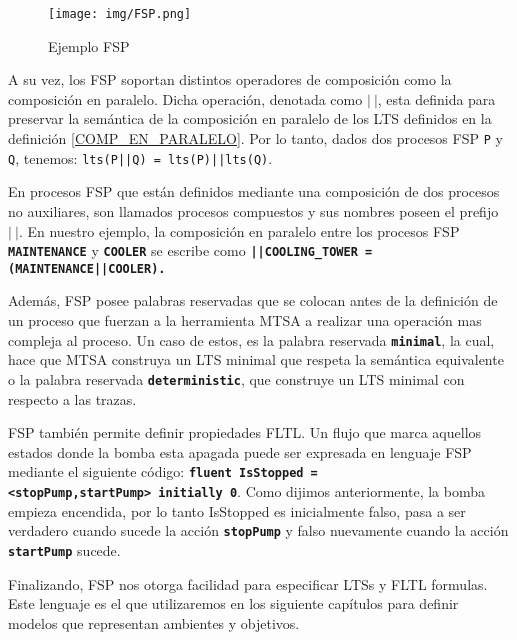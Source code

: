 \begin{figure}
    \centering
    \texttt{[image: img/FSP.png]}
    \caption{Ejemplo FSP}
    \label{FSP}
\end{figure}

A su vez, los FSP soportan distintos operadores de composición como la composición en paralelo. Dicha operación,
denotada como $|\ |$, esta definida para preservar la semántica de la composición en paralelo de los LTS definidos en la
definición \ref{COMP_EN_PARALELO}. Por lo tanto, dados dos procesos FSP \texttt{P} y \texttt{Q}, tenemos:
\texttt{lts(P||Q) = lts(P)||lts(Q)}.

En procesos FSP que están definidos mediante una composición de dos procesos no auxiliares, son llamados procesos
compuestos y sus nombres poseen el prefijo $|\ |$. En nuestro ejemplo, la composición en paralelo entre los procesos FSP 
\texttt{\textbf{MAINTENANCE}} y \texttt{\textbf{COOLER}} se escribe como \texttt{\textbf{||COOLING\_TOWER =
(MAINTENANCE||COOLER).}}

Además, FSP posee palabras reservadas que se colocan antes de la definición de un proceso que fuerzan a la herramienta
MTSA a realizar una operación mas compleja al proceso. Un caso de estos, es la palabra reservada
\texttt{\textbf{minimal}}, la cual, hace que MTSA construya un LTS minimal que respeta la semántica equivalente o la
palabra reservada \texttt{\textbf{deterministic}}, que construye un LTS minimal con respecto a las trazas.

FSP también permite definir propiedades FLTL. Un flujo que marca aquellos estados donde la bomba esta apagada puede ser
expresada en lenguaje FSP mediante el siguiente código: \texttt{\textbf{fluent IsStopped = <stopPump,startPump>\ initially 0}}.
Como dijimos anteriormente, la bomba empieza encendida, por lo tanto IsStopped es inicialmente falso, pasa a ser
verdadero cuando sucede la acción \texttt{\textbf{stopPump}} y falso nuevamente cuando la acción \texttt{\textbf{startPump}} sucede.

Finalizando, FSP nos otorga facilidad para especificar LTSs y FLTL formulas. Este lenguaje es el que utilizaremos en los
siguiente capítulos para definir modelos que representan ambientes y objetivos. 
